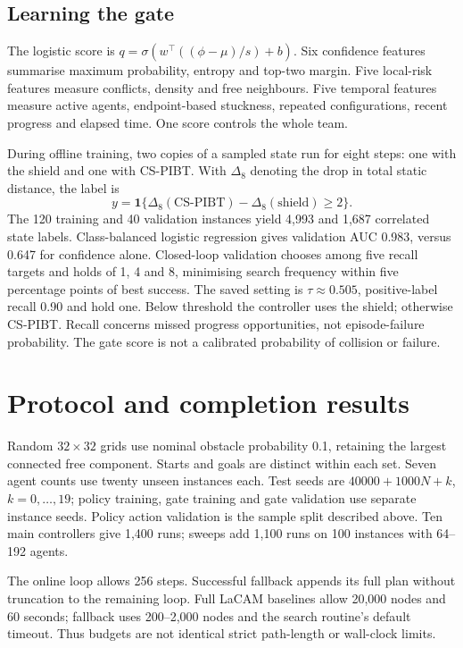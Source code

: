 \documentclass[10pt,a4paper]{article}
\begin{document}
\subsection{Learning the gate}
The logistic score is $q=\sigma(w^\top((\phi-\mu)/s)+b)$. Six confidence features summarise maximum probability, entropy and top-two margin. Five local-risk features measure conflicts, density and free neighbours. Five temporal features measure active agents, endpoint-based stuckness, repeated configurations, recent progress and elapsed time. One score controls the whole team.

During offline training, two copies of a sampled state run for eight steps: one with the shield and one with CS-PIBT. With $\Delta_8$ denoting the drop in total static distance, the label is
\[
y=\mathbf{1}\{\Delta_8(\text{CS-PIBT})-\Delta_8(\text{shield})\ge2\}.
\]
The 120 training and 40 validation instances yield 4,993 and 1,687 correlated state labels. Class-balanced logistic regression gives validation AUC 0.983, versus 0.647 for confidence alone. Closed-loop validation chooses among five recall targets and holds of 1, 4 and 8, minimising search frequency within five percentage points of best success. The saved setting is $\tau\approx0.505$, positive-label recall 0.90 and hold one. Below threshold the controller uses the shield; otherwise CS-PIBT. Recall concerns missed progress opportunities, not episode-failure probability. The gate score is not a calibrated probability of collision or failure.

\newpage
\section{Protocol and completion results}
Random $32\times32$ grids use nominal obstacle probability 0.1, retaining the largest connected free component. Starts and goals are distinct within each set. Seven agent counts use twenty unseen instances each. Test seeds are $40000+1000N+k$, $k=0,\ldots,19$; policy training, gate training and gate validation use separate instance seeds. Policy action validation is the sample split described above. Ten main controllers give 1,400 runs; sweeps add 1,100 runs on 100 instances with 64--192 agents.

The online loop allows 256 steps. Successful fallback appends its full plan without truncation to the remaining loop. Full LaCAM baselines allow 20,000 nodes and 60 seconds; fallback uses 200--2,000 nodes and the search routine's default timeout. Thus budgets are not identical strict path-length or wall-clock limits.
\end{document}
